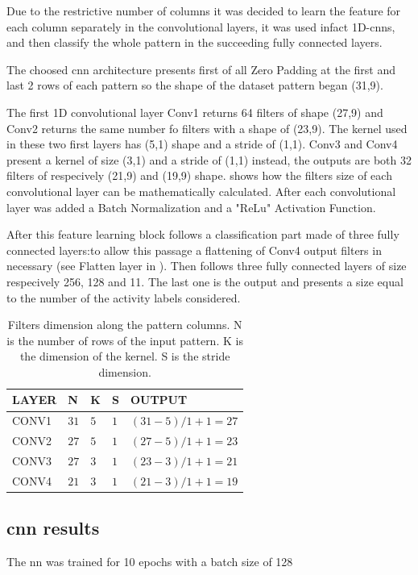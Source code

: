 Due to the restrictive number of columns it was decided to learn the feature for each column separately in the convolutional layers, it was used infact 1D-\glspl{cnn}, and then classify the whole pattern in the succeeding fully connected layers. 

The choosed \gls{cnn} architecture presents first of all Zero Padding at the first and last 2 rows of each pattern so the shape of the dataset pattern began (31,9). 

The first 1D convolutional layer Conv1 returns 64 filters of shape (27,9) and Conv2 returns the same number fo filters with a shape of (23,9). The kernel used in these two first layers has (5,1) shape and a stride of (1,1). 
Conv3 and Conv4 present a kernel of size (3,1) and a stride of (1,1) instead, the outputs are both 32 filters of respecively (21,9) and (19,9) shape.
 shows how the filters size of each convolutional layer can be mathematically calculated. After each convolutional layer was added a Batch Normalization and a "ReLu" Activation Function.

After this feature learning block follows a classification part made of three fully connected layers:to allow this passage a flattening of Conv4 output filters in necessary (see Flatten layer in ). Then follows three fully connected layers of size respecively 256, 128 and 11. The last one is the output and presents a size equal to the number of the activity labels considered.







\begin{table}[htp]
\small
	\centering
		\renewcommand{\arraystretch}{1}%
	\begin{tabular}{@{}lllll@{}}
	\toprule
	LAYER & N & K & S & OUTPUT\\
	\midrule
	CONV1 & $31$ & $5$ & $1$ & $(31-5)/1+1 = 27$\\
	CONV2 & $27$ & $5$ & $1$ & $(27-5)/1+1 = 23$\\
	CONV3 & $27$ & $3$ & $1$ & $(23-3)/1+1 = 21$\\
	CONV4 & $21$ & $3$ & $1$ & $(21-3)/1+1 = 19$\\ 
	\bottomrule
	\end{tabular}
	\caption{Filters dimension along the pattern columns. N is the number of rows of the input pattern. K is the dimension of the kernel. S is the stride dimension.}
	\label{tab:filtersize}
\end{table}




\subsection{\gls{cnn} results}

The \gls{nn} was trained for 10 epochs with a batch size of 128





